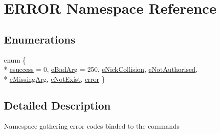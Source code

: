 \hypertarget{namespace_e_r_r_o_r}{\section{E\-R\-R\-O\-R Namespace Reference}
\label{namespace_e_r_r_o_r}
}
\subsection*{Enumerations}
\begin{DoxyCompactItemize}
\item 
enum \{ \\*
\hyperlink{namespace_e_r_r_o_r_aed14e4eb7f2fd1cd45a3d6fdf5fb974cad05fc784bcbbf72d78d73aa517f0f347}{esuccess} = 0, 
\hyperlink{namespace_e_r_r_o_r_aed14e4eb7f2fd1cd45a3d6fdf5fb974ca2357c51e16615bb8e0cdbdc4260edf40}{e\-Bad\-Arg} = 250, 
\hyperlink{namespace_e_r_r_o_r_aed14e4eb7f2fd1cd45a3d6fdf5fb974caeb911bc1364ca34710928803e5292c4d}{e\-Nick\-Collision}, 
\hyperlink{namespace_e_r_r_o_r_aed14e4eb7f2fd1cd45a3d6fdf5fb974ca3b8f93ae7303eb6814c40966b70e5485}{e\-Not\-Authorised}, 
\\*
\hyperlink{namespace_e_r_r_o_r_aed14e4eb7f2fd1cd45a3d6fdf5fb974cab1afee56c1edb2f0cb40b6bc0e456e7e}{e\-Missing\-Arg}, 
\hyperlink{namespace_e_r_r_o_r_aed14e4eb7f2fd1cd45a3d6fdf5fb974cacb4279d0b3eb7c9ba6fe31fe1a43941f}{e\-Not\-Exist}, 
\hyperlink{namespace_e_r_r_o_r_aed14e4eb7f2fd1cd45a3d6fdf5fb974ca247e6a0d1ca9059f7afc0a1fdf25d702}{error}
 \}
\end{DoxyCompactItemize}


\subsection{Detailed Description}
Namespace gathering error codes binded to the commands 

